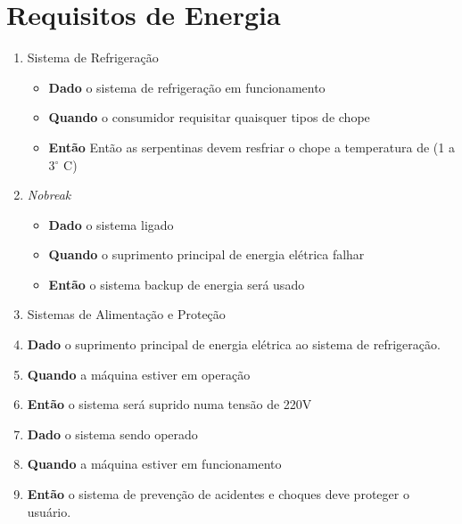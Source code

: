 	\section[Requisitos de Energia]{Requisitos de Energia}
		\begin{enumerate}
			\item Sistema de Refrigeração
				\begin{itemize}
					\item \textbf{Dado} o sistema de refrigeração em funcionamento  
					\item \textbf{Quando} o consumidor requisitar quaisquer tipos de chope 
					\item \textbf{Então} Então as serpentinas devem resfriar o chope a temperatura de (1 a 3$^{\circ}$ C)
				\end{itemize}
			\item \textit{Nobreak} 
				\begin{itemize}
					\item \textbf{Dado} o sistema ligado
					\item \textbf{Quando} o suprimento principal de energia elétrica falhar
					\item \textbf{Então} o sistema backup de energia será usado
				\end{itemize}
			\item Sistemas de Alimentação e Proteção 
					\item \textbf{Dado} o suprimento principal de energia elétrica ao sistema de refrigeração.
					\item \textbf{Quando} a máquina estiver em operação 
					\item \textbf{Então} o sistema será suprido numa tensão de 220V
					\item \textbf{Dado} o sistema sendo operado 
					\item \textbf{Quando} a máquina estiver em funcionamento 
					\item \textbf{Então} o sistema de prevenção de acidentes e choques deve proteger o usuário.
		\end{enumerate}



